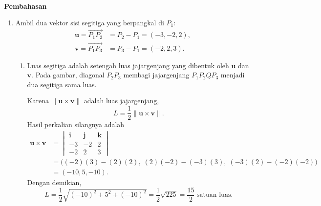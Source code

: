 \documentclass[11pt,a4paper]{article}
\newcommand{\vect}[1]{\overrightarrow{#1}}
\begin{document}
\newpage

\begin{center}
    {\Large\bfseries Pembahasan}
\end{center}

\begin{enumerate}
\item
Ambil dua vektor sisi segitiga yang berpangkal di $P_1$:
\begin{align*}
    \mathbf{u}=\vect{P_1P_2}&=P_2-P_1=(-3,-2,2),\\
    \mathbf{v}=\vect{P_1P_3}&=P_3-P_1=(-2,2,3).
\end{align*}

\begin{enumerate}
\item

Luas segitiga adalah setengah luas jajargenjang yang dibentuk oleh
$\mathbf{u}$ dan $\mathbf{v}$. Pada gambar, diagonal $P_2P_3$
membagi jajargenjang $P_1P_2QP_3$ menjadi dua segitiga sama luas.
\begin{center}
\end{center}
Karena $\|\mathbf{u}\times\mathbf{v}\|$ adalah luas jajargenjang,
\[
    L=\frac12\|\mathbf{u}\times\mathbf{v}\|.
\]
Hasil perkalian silangnya adalah
\begin{align*}
    \mathbf{u}\times\mathbf{v}
    &=\begin{vmatrix}
        \mathbf{i}&\mathbf{j}&\mathbf{k}\\
        -3&-2&2\\
        -2&2&3
    \end{vmatrix}\\
    &=\bigl((-2)(3)-(2)(2),\;
            (2)(-2)-(-3)(3),\;
            (-3)(2)-(-2)(-2)\bigr)\\
    &=(-10,5,-10).
\end{align*}
Dengan demikian,
\[
    L=\frac12\sqrt{(-10)^2+5^2+(-10)^2}
     =\frac12\sqrt{225}
     =\boxed{\frac{15}{2}\text{ satuan luas}}.
\]


\end{enumerate}
\end{enumerate}
\end{document}
